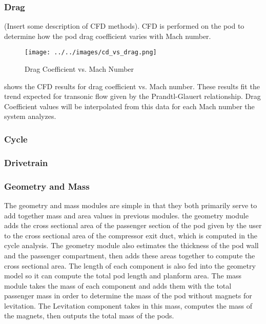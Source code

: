 \subsubsection{Drag}
	(Insert some description of CFD methods).
	CFD is performed on the pod to determine how the pod drag coefficient varies with Mach number.
	\begin{figure}
		\centering
		\texttt{[image: ../../images/cd\_vs\_drag.png]}
		\caption{Drag Coefficient vs. Mach Number}
		\label{fig:cd_vs_mach}
	\end{figure}
	 shows the CFD results for drag coefficient vs. Mach number. These results fit the trend expected for transonic flow given by the Prandtl-Glauert relationship. Drag Coefficient values will be interpolated from this data for each Mach number the system analyzes.
\subsubsection{Cycle}
\subsubsection{Drivetrain}
\subsubsection{Geometry and Mass}
	The geometry and mass modules are simple in that they both primarily serve to add together mass and area values in previous modules. the geometry module adds the cross sectional area of the passenger section of the pod given by the user to the cross sectional area of the compressor exit duct, which is computed in the cycle analysis. The geometry module also estimates the thickness of the pod wall and the passenger compartment, then adds these areas together to compute the cross sectional area. The length of each component is also fed into the geometry model so it can compute the total pod length and planform area. The mass module takes the mass of each component and adds them with the total passenger mass in order to determine the mass of the pod without magnets for levitation. The Levitation component takes in this mass, computes the mass of the magnets, then outputs the total mass of the pods.
